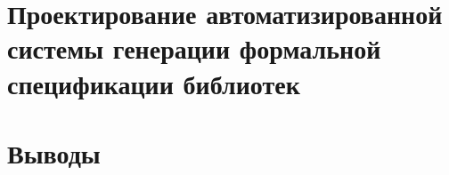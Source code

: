 \chapter{Проектирование автоматизированной системы генерации формальной спецификации библиотек}

\blindtext

\chapter{Выводы}
